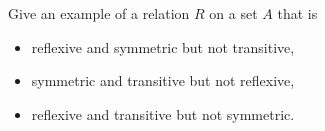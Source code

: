 Give an example of a relation $R$ on a set $A$ that is
\begin{itemize}
    \item reflexive and symmetric but not transitive,
    \item symmetric and transitive but not reflexive,
    \item reflexive and transitive but not symmetric.
\end{itemize}